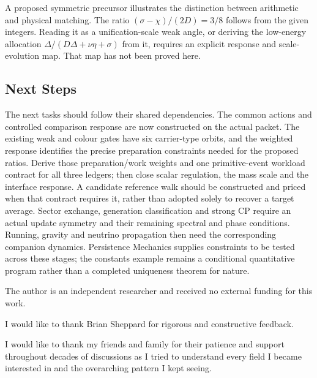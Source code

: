 A proposed symmetric precursor illustrates the distinction between arithmetic and physical matching. The ratio $(\sigma-\chi)/(2D)=3/8$ follows from the given integers. Reading it as a unification-scale weak angle, or deriving the low-energy allocation $\Delta/(D\Delta+\nu\eta+\sigma)$ from it, requires an explicit response and scale-evolution map. That map has not been proved here.

\subsection{Next Steps}
The next tasks should follow their shared dependencies. The common actions and controlled comparison response are now constructed on the actual packet. The existing weak and colour gates have six carrier-type orbits, and the weighted response identifies the precise preparation constraints needed for the proposed ratios. Derive those preparation/work weights and one primitive-event workload contract for all three ledgers; then close scalar regulation, the mass scale and the interface response. A candidate reference walk should be constructed and priced when that contract requires it, rather than adopted solely to recover a target average. Sector exchange, generation classification and strong CP require an actual update symmetry and their remaining spectral and phase conditions. Running, gravity and neutrino propagation then need the corresponding companion dynamics. Persistence Mechanics supplies constraints to be tested across these stages; the constants example remains a conditional quantitative program rather than a completed uniqueness theorem for nature.

\begin{acknowledgments}
The author is an independent researcher and received no external funding for this work.

I would like to thank Brian Sheppard for rigorous and constructive feedback.

I would like to thank my friends and family for their patience and support throughout decades of discussions as I tried to understand every field I became interested in and the overarching pattern I kept seeing.
\end{acknowledgments}
